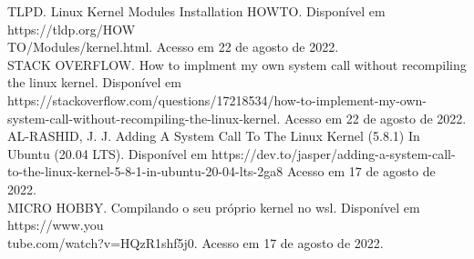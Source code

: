 \documentclass[a4paper, 12pt]{article}
\begin{document}
\footnotesize{

\noindent TLPD. Linux Kernel Modules Installation HOWTO. Disponível em https://tldp.org/HOW\\TO/Modules/kernel.html. Acesso em 22 de agosto de 2022.\\

\noindent STACK OVERFLOW. How to implment my own system call without recompiling the linux kernel. Disponível em https://stackoverflow.com/questions/17218534/how-to-implement-my-own-system-call-without-recompiling-the-linux-kernel. Acesso em 22 de agosto de 2022.\\

\noindent AL-RASHID, J. J. Adding A System Call To The Linux Kernel (5.8.1) In Ubuntu (20.04 LTS). Disponível em https://dev.to/jasper/adding-a-system-call-to-the-linux-kernel-5-8-1-in-ubuntu-20-04-lts-2ga8 Acesso em 17 de agosto de 2022.\\

\noindent MICRO HOBBY. Compilando o seu próprio kernel no wsl. Disponível em https://www.you\\tube.com/watch?v=HQzR1shf5j0. Acesso em 17 de agosto de 2022.

}
\newpage
\end{document}
